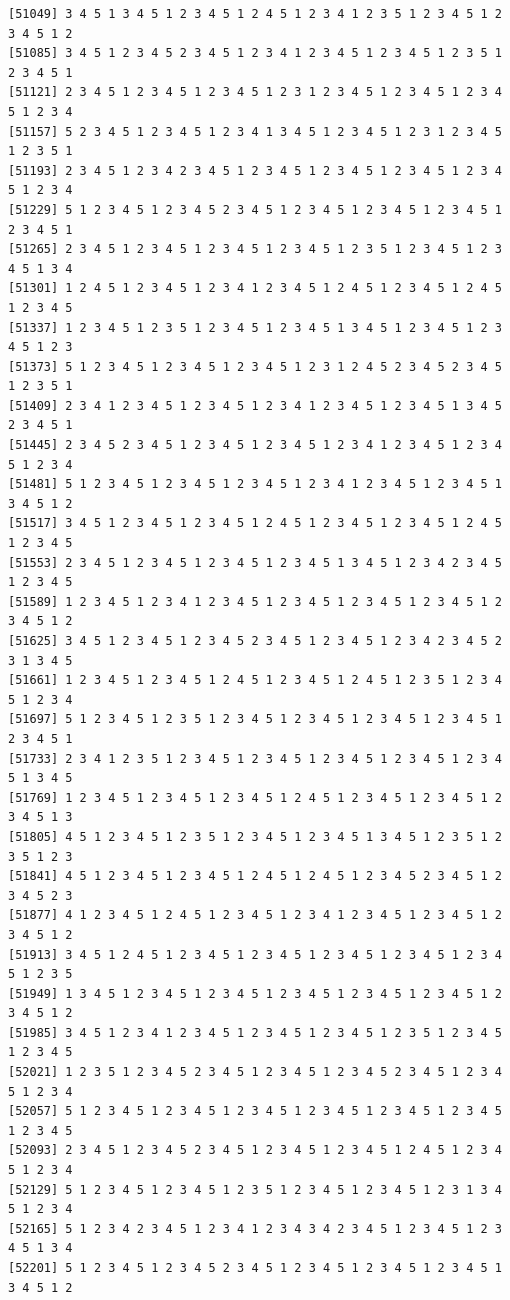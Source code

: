 \documentclass[
  11pt,
]{book}
\begin{document}
\begin{verbatim}
[51049] 3 4 5 1 3 4 5 1 2 3 4 5 1 2 4 5 1 2 3 4 1 2 3 5 1 2 3 4 5 1 2 3 4 5 1 2
[51085] 3 4 5 1 2 3 4 5 2 3 4 5 1 2 3 4 1 2 3 4 5 1 2 3 4 5 1 2 3 5 1 2 3 4 5 1
[51121] 2 3 4 5 1 2 3 4 5 1 2 3 4 5 1 2 3 1 2 3 4 5 1 2 3 4 5 1 2 3 4 5 1 2 3 4
[51157] 5 2 3 4 5 1 2 3 4 5 1 2 3 4 1 3 4 5 1 2 3 4 5 1 2 3 1 2 3 4 5 1 2 3 5 1
[51193] 2 3 4 5 1 2 3 4 2 3 4 5 1 2 3 4 5 1 2 3 4 5 1 2 3 4 5 1 2 3 4 5 1 2 3 4
[51229] 5 1 2 3 4 5 1 2 3 4 5 2 3 4 5 1 2 3 4 5 1 2 3 4 5 1 2 3 4 5 1 2 3 4 5 1
[51265] 2 3 4 5 1 2 3 4 5 1 2 3 4 5 1 2 3 4 5 1 2 3 5 1 2 3 4 5 1 2 3 4 5 1 3 4
[51301] 1 2 4 5 1 2 3 4 5 1 2 3 4 1 2 3 4 5 1 2 4 5 1 2 3 4 5 1 2 4 5 1 2 3 4 5
[51337] 1 2 3 4 5 1 2 3 5 1 2 3 4 5 1 2 3 4 5 1 3 4 5 1 2 3 4 5 1 2 3 4 5 1 2 3
[51373] 5 1 2 3 4 5 1 2 3 4 5 1 2 3 4 5 1 2 3 1 2 4 5 2 3 4 5 2 3 4 5 1 2 3 5 1
[51409] 2 3 4 1 2 3 4 5 1 2 3 4 5 1 2 3 4 1 2 3 4 5 1 2 3 4 5 1 3 4 5 2 3 4 5 1
[51445] 2 3 4 5 2 3 4 5 1 2 3 4 5 1 2 3 4 5 1 2 3 4 1 2 3 4 5 1 2 3 4 5 1 2 3 4
[51481] 5 1 2 3 4 5 1 2 3 4 5 1 2 3 4 5 1 2 3 4 1 2 3 4 5 1 2 3 4 5 1 3 4 5 1 2
[51517] 3 4 5 1 2 3 4 5 1 2 3 4 5 1 2 4 5 1 2 3 4 5 1 2 3 4 5 1 2 4 5 1 2 3 4 5
[51553] 2 3 4 5 1 2 3 4 5 1 2 3 4 5 1 2 3 4 5 1 3 4 5 1 2 3 4 2 3 4 5 1 2 3 4 5
[51589] 1 2 3 4 5 1 2 3 4 1 2 3 4 5 1 2 3 4 5 1 2 3 4 5 1 2 3 4 5 1 2 3 4 5 1 2
[51625] 3 4 5 1 2 3 4 5 1 2 3 4 5 2 3 4 5 1 2 3 4 5 1 2 3 4 2 3 4 5 2 3 1 3 4 5
[51661] 1 2 3 4 5 1 2 3 4 5 1 2 4 5 1 2 3 4 5 1 2 4 5 1 2 3 5 1 2 3 4 5 1 2 3 4
[51697] 5 1 2 3 4 5 1 2 3 5 1 2 3 4 5 1 2 3 4 5 1 2 3 4 5 1 2 3 4 5 1 2 3 4 5 1
[51733] 2 3 4 1 2 3 5 1 2 3 4 5 1 2 3 4 5 1 2 3 4 5 1 2 3 4 5 1 2 3 4 5 1 3 4 5
[51769] 1 2 3 4 5 1 2 3 4 5 1 2 3 4 5 1 2 4 5 1 2 3 4 5 1 2 3 4 5 1 2 3 4 5 1 3
[51805] 4 5 1 2 3 4 5 1 2 3 5 1 2 3 4 5 1 2 3 4 5 1 3 4 5 1 2 3 5 1 2 3 5 1 2 3
[51841] 4 5 1 2 3 4 5 1 2 3 4 5 1 2 4 5 1 2 4 5 1 2 3 4 5 2 3 4 5 1 2 3 4 5 2 3
[51877] 4 1 2 3 4 5 1 2 4 5 1 2 3 4 5 1 2 3 4 1 2 3 4 5 1 2 3 4 5 1 2 3 4 5 1 2
[51913] 3 4 5 1 2 4 5 1 2 3 4 5 1 2 3 4 5 1 2 3 4 5 1 2 3 4 5 1 2 3 4 5 1 2 3 5
[51949] 1 3 4 5 1 2 3 4 5 1 2 3 4 5 1 2 3 4 5 1 2 3 4 5 1 2 3 4 5 1 2 3 4 5 1 2
[51985] 3 4 5 1 2 3 4 1 2 3 4 5 1 2 3 4 5 1 2 3 4 5 1 2 3 5 1 2 3 4 5 1 2 3 4 5
[52021] 1 2 3 5 1 2 3 4 5 2 3 4 5 1 2 3 4 5 1 2 3 4 5 2 3 4 5 1 2 3 4 5 1 2 3 4
[52057] 5 1 2 3 4 5 1 2 3 4 5 1 2 3 4 5 1 2 3 4 5 1 2 3 4 5 1 2 3 4 5 1 2 3 4 5
[52093] 2 3 4 5 1 2 3 4 5 2 3 4 5 1 2 3 4 5 1 2 3 4 5 1 2 4 5 1 2 3 4 5 1 2 3 4
[52129] 5 1 2 3 4 5 1 2 3 4 5 1 2 3 5 1 2 3 4 5 1 2 3 4 5 1 2 3 1 3 4 5 1 2 3 4
[52165] 5 1 2 3 4 2 3 4 5 1 2 3 4 1 2 3 4 3 4 2 3 4 5 1 2 3 4 5 1 2 3 4 5 1 3 4
[52201] 5 1 2 3 4 5 1 2 3 4 5 2 3 4 5 1 2 3 4 5 1 2 3 4 5 1 2 3 4 5 1 3 4 5 1 2

\end{verbatim}
\end{document}
